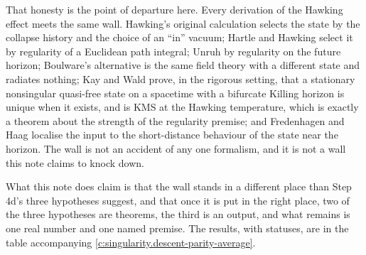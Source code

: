 \documentclass[11pt]{article}
\theoremstyle{definition}
\theoremstyle{plain}
\begin{document}
That honesty is the point of departure here. Every derivation of the Hawking effect meets the same wall. Hawking's original calculation \cite{Hawking1975} selects the state by the collapse history and the choice of an ``in'' vacuum; Hartle and Hawking \cite{HartleHawking1976} select it by regularity of a Euclidean path integral; Unruh \cite{Unruh1976} by regularity on the future horizon; Boulware's alternative \cite{Boulware1975} is the same field theory with a different state and radiates nothing; Kay and Wald \cite{KayWald1991} prove, in the rigorous setting, that a stationary nonsingular quasi-free state on a spacetime with a bifurcate Killing horizon is unique when it exists, and is KMS at the Hawking temperature, which is exactly a theorem about the strength of the regularity premise; and Fredenhagen and Haag \cite{FredenhagenHaag1990} localise the input to the short-distance behaviour of the state near the horizon. The wall is not an accident of any one formalism, and it is not a wall this note claims to knock down.

What this note does claim is that the wall stands in a different place than Step 4d's three hypotheses suggest, and that once it is put in the right place, two of the three hypotheses are theorems, the third is an output, and what remains is one real number and one named premise. The results, with statuses, are in the table accompanying \ref{c:singularity.descent-parity-average}.
\end{document}
